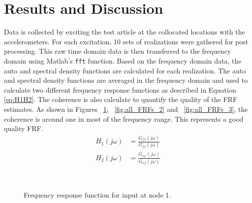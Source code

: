 \documentclass[paper=a4, fontsize=12pt]{scrartcl} %
\begin{document}
\section*{Results and Discussion}
Data is collected by exciting the test article at the collocated locations with the accelerometers. For each excitation, 10 sets of realizations were gathered for post processing. This raw time domain data is then transferred to the frequency domain using Matlab's \texttt{fft} function. Based on the frequency domain data, the auto and spectral density functions are calculated for each realization. The auto and spectral density functions are averaged in the frequency domain and used to calculate two different frequency response functions as described in Equation \eqref{eq:H1H2}. The coherence is also calculate to quantify the quality of the FRF estimates. As shown in Figures ~\ref{fig:all_FRFs_1}, ~\ref{fig:all_FRFs_2} and ~\ref{fig:all_FRFs_3}, the coherence is around one in most of the frequency range. This represents a good quality FRF.
%
\begin{subequations}\label{eq:H1H2}
\begin{align}
H_1(j\omega) &= \frac{G_{fx}(j\omega)}{G_{ff}(j\omega)} \\
H_2(j\omega) &= \frac{G_{xx}(j\omega)}{G_{xf}(j\omega)}
\end{align}
\end{subequations}
%
%
\begin{figure}[H]
	\centering
	\quad
	\\
	\caption{Frequency response function for input at node 1.}
	\label{fig:all_FRFs_1}
\end{figure}
\end{document}
